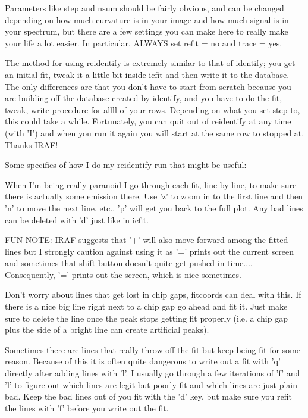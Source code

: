 \documentclass[letter,11pt,oneside]{article}
\begin{document}
Parameters like step and nsum should be fairly obvious, and can be
changed depending on how much curvature is in your image and how much
signal is in your spectrum, but there are a few settings you can make
here to really make your life a lot easier. In particular, ALWAYS set
refit = no and trace = yes.

The method for using reidentify is extremely similar to that of
identify; you get an initial fit, tweak it a little bit inside icfit
and then write it to the database. The only differences are that you
don't have to start from scratch because you are building off the
database created by identify, and you have to do the fit, tweak, write
procedure for allll of your rows. Depending on what you set step to,
this could take a while. Fortunately, you can quit out of reidentify
at any time (with 'I') and when you run it again you will start at the
same row to stopped at. Thanks IRAF!

Some specifics of how I do my reidentify run that might be useful:

When I'm being really paranoid I go through each fit, line by line, to
make sure there is actually some emission there. Use 'z' to zoom in to
the first line and then 'n' to move the next line, etc.. 'p' will get
you back to the full plot. Any bad lines can be deleted with 'd' just
like in icfit.

FUN NOTE: IRAF suggests that '+' will also move forward among the
fitted lines but I strongly caution against using it as '=' prints out
the current screen and sometimes that shift button doesn't quite get
pushed in time.... Consequently, '=' prints out the screen, which is
nice sometimes.

Don't worry about lines that get lost in chip gaps, fitcoords can deal
with this. If there is a nice big line right next to a chip gap go
ahead and fit it. Just make sure to delete the line once the peak
stops getting fit properly (i.e. a chip gap plus the side of a bright
line can create artificial peaks).

Sometimes there are lines that really throw off the fit but keep being
fit for some reason. Because of this it is often quite dangerous to
write out a fit with 'q' directly after adding lines with 'l'. I
usually go through a few iterations of 'f' and 'l' to figure out which
lines are legit but poorly fit and which lines are just plain
bad. Keep the bad lines out of you fit with the 'd' key, but make sure
you refit the lines with 'f' before you write out the fit.
\end{document}
